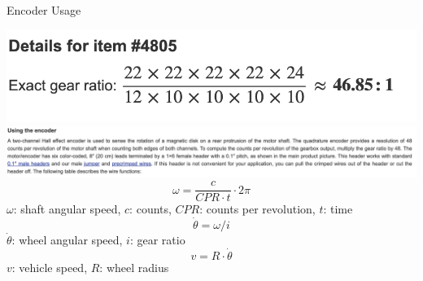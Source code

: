 \documentclass[12pt,letterpaper]{beamer}
\begin{document}
\begin{frame}{Encoder Usage}
    
    \centering
    \includegraphics[width=0.3\linewidth]{gear_ratio}
    \includegraphics[width=0.9\linewidth]{encoder_usage}
    {\footnotesize
    \begin{equation*}
        \omega = \frac{c}{CPR \cdot t} \cdot 2\pi
    \end{equation*}
    $\omega$: shaft angular speed, $c$: counts, $CPR$: counts per revolution, $t$: time
    \begin{equation*}
        \dot{\theta} = \omega/i
    \end{equation*}
    $\dot{\theta}$: wheel angular speed, $i$: gear ratio
    \begin{equation*}
        v = R \cdot \dot{\theta}
    \end{equation*}
    $v$: vehicle speed, $R$: wheel radius
    }

\end{frame}
\end{document}
